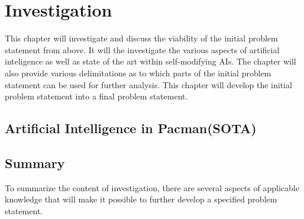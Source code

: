
\section{Investigation} \label{sec:preanalysus}
This chapter will investigate and discuss the viability of the initial problem statement from above. It will the investigate the various aspects of artificial inteligence as well as state of the art within self-modifying AIs. The chapter will also provide various delimitations as to which parts of the initial problem statement can be used for further analysis. This chapter will develop the initial problem statement into a final problem statement.





\subsection{Artificial Intelligence in Pacman(SOTA)}



\subsection{Summary}
To summarize the content of investigation, there are several aspects of applicable knowledge that will make it possible to further develop a specified problem statement.

